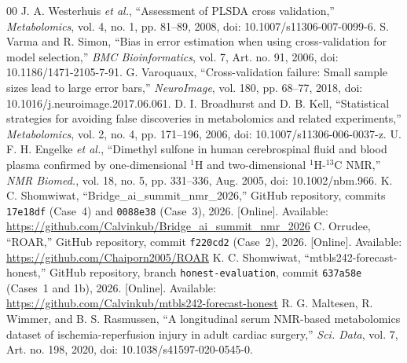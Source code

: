 \documentclass[conference]{IEEEtran}
\begin{document}
\begin{thebibliography}{00}
 J. A. Westerhuis \textit{et al.}, ``Assessment of PLSDA cross validation,'' \textit{Metabolomics}, vol. 4, no. 1, pp. 81--89, 2008, doi: 10.1007/s11306-007-0099-6.
 S. Varma and R. Simon, ``Bias in error estimation when using cross-validation for model selection,'' \textit{BMC Bioinformatics}, vol. 7, Art. no. 91, 2006, doi: 10.1186/1471-2105-7-91.
 G. Varoquaux, ``Cross-validation failure: Small sample sizes lead to large error bars,'' \textit{NeuroImage}, vol. 180, pp. 68--77, 2018, doi: 10.1016/j.neuroimage.2017.06.061.
 D. I. Broadhurst and D. B. Kell, ``Statistical strategies for avoiding false discoveries in metabolomics and related experiments,'' \textit{Metabolomics}, vol. 2, no. 4, pp. 171--196, 2006, doi: 10.1007/s11306-006-0037-z.
 U. F. H. Engelke \textit{et al.}, ``Dimethyl sulfone in human cerebrospinal fluid and blood plasma confirmed by one-dimensional $^1$H and two-dimensional $^1$H-$^{13}$C NMR,'' \textit{NMR Biomed.}, vol. 18, no. 5, pp. 331--336, Aug. 2005, doi: 10.1002/nbm.966.
 K. C. Shomwiwat, ``Bridge\_ai\_summit\_nmr\_2026,'' GitHub repository, commits \texttt{17e18df} (Case~4) and \texttt{0088e38} (Case~3), 2026. [Online]. Available: \url{https://github.com/Calvinkub/Bridge_ai_summit_nmr_2026}
 C. Orrudee, ``ROAR,'' GitHub repository, commit \texttt{f220cd2} (Case~2), 2026. [Online]. Available: \url{https://github.com/Chaiporn2005/ROAR}
 K. C. Shomwiwat, ``mtbls242-forecast-honest,'' GitHub repository, branch \texttt{honest-evaluation}, commit \texttt{637a58e} (Cases~1 and 1b), 2026. [Online]. Available: \url{https://github.com/Calvinkub/mtbls242-forecast-honest}
 R. G. Maltesen, R. Wimmer, and B. S. Rasmussen, ``A longitudinal serum NMR-based metabolomics dataset of ischemia-reperfusion injury in adult cardiac surgery,'' \textit{Sci. Data}, vol. 7, Art. no. 198, 2020, doi: 10.1038/s41597-020-0545-0.
\end{thebibliography}
\end{document}
